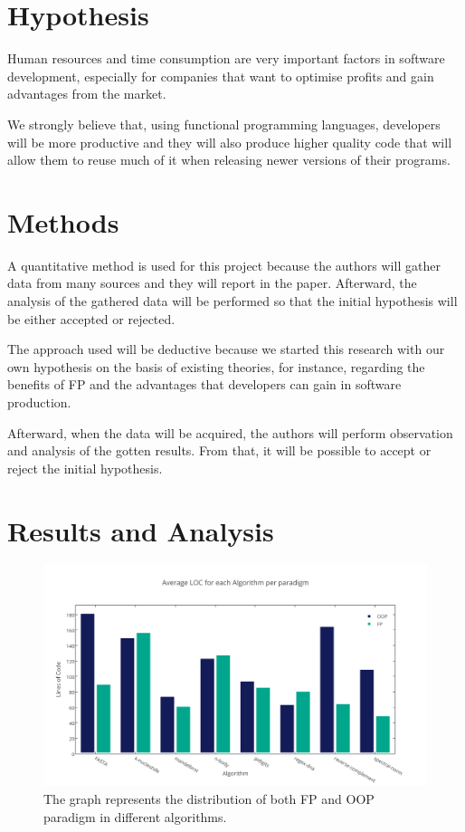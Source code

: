 \documentclass{article}
\begin{document}
\section{Hypothesis}

Human resources and time consumption are very important factors in software development, especially for companies that want to optimise profits and gain advantages from the market. 

We strongly believe that, using functional programming languages, developers will be more productive and they will also produce higher quality code that will allow them to reuse much of it when releasing newer versions of their programs.

\section{Methods}

A quantitative method is used for this project because the authors will gather data from many sources and they will report in the paper. Afterward, the analysis of the gathered data will be performed so that the initial hypothesis will be either accepted or rejected.

The approach used will be deductive because we started this research with our own hypothesis on the basis of existing theories, for instance, regarding the benefits of FP and the advantages that developers can gain in software production.

Afterward, when the data will be acquired, the authors will perform observation and analysis of the gotten results. From that, it will be possible to accept or reject the initial hypothesis.

\section{Results and Analysis}


\begin{figure}[h]
\includegraphics[width=\textwidth]{1}
\caption{The graph represents the distribution of both FP and OOP paradigm in different algorithms.}
\end{figure}
\end{document}
